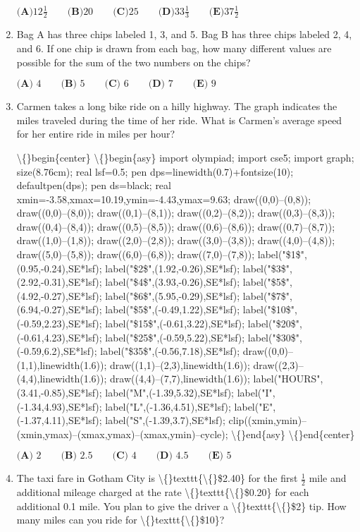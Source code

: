 \documentclass{article}
\begin{document}
\begin{enumerate}[label=\arabic*., itemsep=0.5em]
\( \textbf{(A)}12\frac{1}{2}\qquad\textbf{(B)}20\qquad\textbf{(C)}25\qquad\textbf{(D)}33\frac{1}{3}\qquad\textbf{(E)}37\frac{1}{2} \)\par \vspace{0.5em}\item Bag A has three chips labeled 1, 3, and 5. Bag B has three chips labeled 2, 4, and 6. If one chip is drawn from each bag, how many different values are possible for the sum of the two numbers on the chips?

\( \textbf{(A) }4 \qquad\textbf{(B) }5 \qquad\textbf{(C) }6 \qquad\textbf{(D) }7 \qquad\textbf{(E) }9 \)\par \vspace{0.5em}\item Carmen takes a long bike ride on a hilly highway. The graph indicates the miles traveled during the time of her ride. What is Carmen's average speed for her entire ride in miles per hour?

\textbackslash\{\}begin\{center\}
\textbackslash\{\}begin\{asy\}
import olympiad;
import cse5;
import graph; size(8.76cm); real lsf=0.5; pen dps=linewidth(0.7)+fontsize(10); defaultpen(dps); pen ds=black; real xmin=-3.58,xmax=10.19,ymin=-4.43,ymax=9.63; 
draw((0,0)--(0,8)); draw((0,0)--(8,0)); draw((0,1)--(8,1)); draw((0,2)--(8,2)); draw((0,3)--(8,3)); draw((0,4)--(8,4)); draw((0,5)--(8,5)); draw((0,6)--(8,6)); draw((0,7)--(8,7)); draw((1,0)--(1,8)); draw((2,0)--(2,8)); draw((3,0)--(3,8)); draw((4,0)--(4,8)); draw((5,0)--(5,8)); draw((6,0)--(6,8)); draw((7,0)--(7,8)); label("\$1\$",(0.95,-0.24),SE*lsf); label("\$2\$",(1.92,-0.26),SE*lsf); label("\$3\$",(2.92,-0.31),SE*lsf); label("\$4\$",(3.93,-0.26),SE*lsf); label("\$5\$",(4.92,-0.27),SE*lsf); label("\$6\$",(5.95,-0.29),SE*lsf); label("\$7\$",(6.94,-0.27),SE*lsf); label("\$5\$",(-0.49,1.22),SE*lsf); label("\$10\$",(-0.59,2.23),SE*lsf); label("\$15\$",(-0.61,3.22),SE*lsf); label("\$20\$",(-0.61,4.23),SE*lsf); label("\$25\$",(-0.59,5.22),SE*lsf); label("\$30\$",(-0.59,6.2),SE*lsf); label("\$35\$",(-0.56,7.18),SE*lsf); draw((0,0)--(1,1),linewidth(1.6)); draw((1,1)--(2,3),linewidth(1.6)); draw((2,3)--(4,4),linewidth(1.6)); draw((4,4)--(7,7),linewidth(1.6)); label("HOURS",(3.41,-0.85),SE*lsf); label("M",(-1.39,5.32),SE*lsf); label("I",(-1.34,4.93),SE*lsf); label("L",(-1.36,4.51),SE*lsf); label("E",(-1.37,4.11),SE*lsf); label("S",(-1.39,3.7),SE*lsf); 
clip((xmin,ymin)--(xmin,ymax)--(xmax,ymax)--(xmax,ymin)--cycle);
\textbackslash\{\}end\{asy\}
\textbackslash\{\}end\{center\}


\( \textbf{(A) }2\qquad\textbf{(B) } 2.5\qquad\textbf{(C) } 4\qquad\textbf{(D) } 4.5\qquad\textbf{(E) } 5 \)\par \vspace{0.5em}\item The taxi fare in Gotham City is \textbackslash\{\}texttt\{\textbackslash\{\}\$2.40\} for the first \(\frac12\) mile and additional mileage charged at the rate \textbackslash\{\}texttt\{\textbackslash\{\}\$0.20\} for each additional 0.1 mile. You plan to give the driver a \textbackslash\{\}texttt\{\textbackslash\{\}\$2\} tip. How many miles can you ride for \textbackslash\{\}texttt\{\textbackslash\{\}\$10\}?


\end{enumerate}
\end{document}
